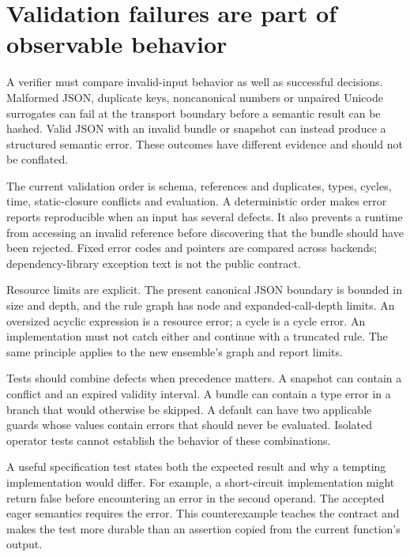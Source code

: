 \section{Validation failures are part of observable behavior}
\label{merge:M07:04}


A verifier must compare invalid-input behavior as well as successful decisions.
Malformed JSON, duplicate keys, noncanonical numbers or unpaired Unicode
surrogates can fail at the transport boundary before a semantic result can be
hashed. Valid JSON with an invalid bundle or snapshot can instead produce a
structured semantic error. These outcomes have different evidence and should
not be conflated.

The current validation order is schema, references and duplicates, types, cycles,
time, static-closure conflicts and evaluation. A deterministic order makes error
reports reproducible when an input has several defects. It also prevents a
runtime from accessing an invalid reference before discovering that the bundle
should have been rejected. Fixed error codes and pointers are compared across
backends; dependency-library exception text is not the public contract.


Resource limits are explicit. The present canonical JSON boundary is bounded in
size and depth, and the rule graph has node and expanded-call-depth limits. An
oversized acyclic expression is a resource error; a cycle is a cycle error. An
implementation must not catch either and continue with a truncated rule. The
same principle applies to the new ensemble's graph and report limits.

Tests should combine defects when precedence matters. A snapshot can contain a
conflict and an expired validity interval. A bundle can contain a type error in a
branch that would otherwise be skipped. A default can have two applicable guards
whose values contain errors that should never be evaluated. Isolated operator
tests cannot establish the behavior of these combinations.

A useful specification test states both the expected result and why a tempting
implementation would differ. For example, a short-circuit implementation might
return false before encountering an error in the second operand. The accepted
eager semantics requires the error. This counterexample teaches the contract and
makes the test more durable than an assertion copied from the current function's
output.

